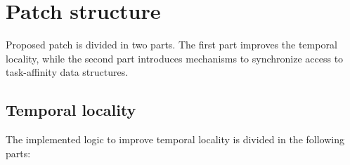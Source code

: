 \section{Patch structure}

Proposed patch is divided in two parts. The first part improves the temporal locality, while the second part introduces mechanisms to synchronize access to 
task-affinity data structures.

\subsection{Temporal locality}

The implemented logic to improve temporal locality is divided in the following parts:

